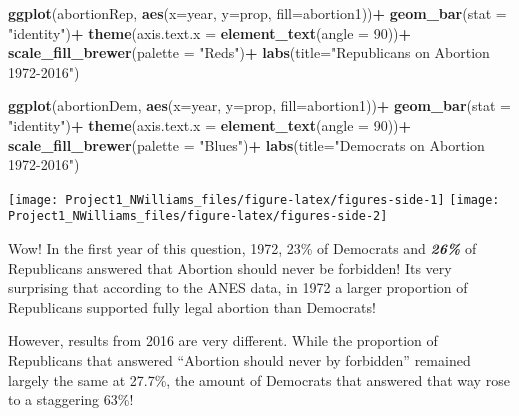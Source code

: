 \documentclass[
]{article}
\newenvironment{Shaded}{\begin{snugshade}}{\end{snugshade}}
\newcommand{\DataTypeTok}[1]{\textcolor[rgb]{0.13,0.29,0.53}{#1}}
\newcommand{\DecValTok}[1]{\textcolor[rgb]{0.00,0.00,0.81}{#1}}
\newcommand{\KeywordTok}[1]{\textcolor[rgb]{0.13,0.29,0.53}{\textbf{#1}}}
\newcommand{\NormalTok}[1]{#1}
\newcommand{\OperatorTok}[1]{\textcolor[rgb]{0.81,0.36,0.00}{\textbf{#1}}}
\newcommand{\StringTok}[1]{\textcolor[rgb]{0.31,0.60,0.02}{#1}}
\begin{document}
\begin{Shaded}
\begin{Highlighting}[]
\KeywordTok{ggplot}\NormalTok{(abortionRep, }\KeywordTok{aes}\NormalTok{(}\DataTypeTok{x=}\NormalTok{year, }\DataTypeTok{y=}\NormalTok{prop, }\DataTypeTok{fill=}\NormalTok{abortion1))}\OperatorTok{+}
\StringTok{  }\KeywordTok{geom_bar}\NormalTok{(}\DataTypeTok{stat =} \StringTok{"identity"}\NormalTok{)}\OperatorTok{+}
\StringTok{  }\KeywordTok{theme}\NormalTok{(}\DataTypeTok{axis.text.x =} \KeywordTok{element_text}\NormalTok{(}\DataTypeTok{angle =} \DecValTok{90}\NormalTok{))}\OperatorTok{+}
\StringTok{  }\KeywordTok{scale_fill_brewer}\NormalTok{(}\DataTypeTok{palette =} \StringTok{"Reds"}\NormalTok{)}\OperatorTok{+}
\StringTok{  }\KeywordTok{labs}\NormalTok{(}\DataTypeTok{title=}\StringTok{"Republicans on Abortion 1972-2016"}\NormalTok{)}

\KeywordTok{ggplot}\NormalTok{(abortionDem, }\KeywordTok{aes}\NormalTok{(}\DataTypeTok{x=}\NormalTok{year, }\DataTypeTok{y=}\NormalTok{prop, }\DataTypeTok{fill=}\NormalTok{abortion1))}\OperatorTok{+}
\StringTok{  }\KeywordTok{geom_bar}\NormalTok{(}\DataTypeTok{stat =} \StringTok{"identity"}\NormalTok{)}\OperatorTok{+}
\StringTok{  }\KeywordTok{theme}\NormalTok{(}\DataTypeTok{axis.text.x =} \KeywordTok{element_text}\NormalTok{(}\DataTypeTok{angle =} \DecValTok{90}\NormalTok{))}\OperatorTok{+}
\StringTok{  }\KeywordTok{scale_fill_brewer}\NormalTok{(}\DataTypeTok{palette =} \StringTok{"Blues"}\NormalTok{)}\OperatorTok{+}
\StringTok{  }\KeywordTok{labs}\NormalTok{(}\DataTypeTok{title=}\StringTok{"Democrats on Abortion 1972-2016"}\NormalTok{)}
\end{Highlighting}
\end{Shaded}

\texttt{[image: Project1\_NWilliams\_files/figure-latex/figures-side-1]}
\texttt{[image: Project1\_NWilliams\_files/figure-latex/figures-side-2]}

Wow! In the first year of this question, 1972, 23\% of Democrats and
\textbf{\emph{26\%}} of Republicans answered that Abortion should never
be forbidden! Its very surprising that according to the ANES data, in
1972 a larger proportion of Republicans supported fully legal abortion
than Democrats!

However, results from 2016 are very different. While the proportion of
Republicans that answered ``Abortion should never by forbidden''
remained largely the same at 27.7\%, the amount of Democrats that
answered that way rose to a staggering 63\%!
\end{document}
